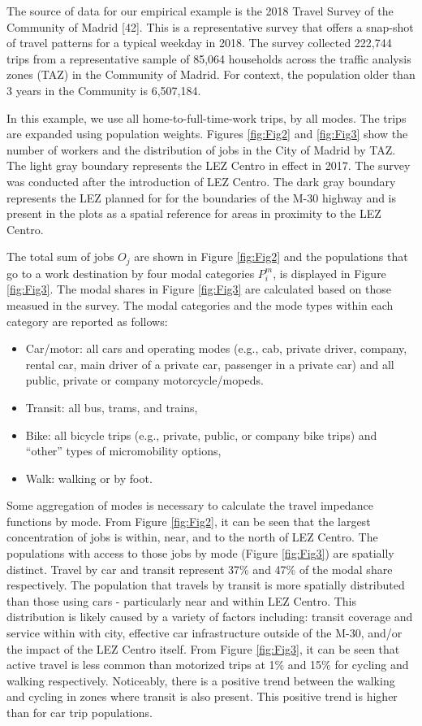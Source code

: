 \documentclass[10pt,letterpaper]{article}
\providecommand{\tightlist}{%
  \setlength{\itemsep}{0pt}\setlength{\parskip}{0pt}}
\begin{document}
The source of data for our empirical example is the 2018 Travel Survey
of the Community of Madrid {[}42{]}. This is a representative survey
that offers a snap-shot of travel patterns for a typical weekday in
2018. The survey collected 222,744 trips from a representative sample of
85,064 households across the traffic analysis zones (TAZ) in the
Community of Madrid. For context, the population older than 3 years in
the Community is 6,507,184.

In this example, we use all home-to-full-time-work trips, by all modes.
The trips are expanded using population weights. Figures \ref{fig:Fig2}
and \ref{fig:Fig3} show the number of workers and the distribution of
jobs in the City of Madrid by TAZ. The light gray boundary represents
the LEZ Centro in effect in 2017. The survey was conducted after the
introduction of LEZ Centro. The dark gray boundary represents the LEZ
planned for for the boundaries of the M-30 highway and is present in the
plots as a spatial reference for areas in proximity to the LEZ Centro.

The total sum of jobs \(O_j\) are shown in Figure \ref{fig:Fig2} and the
populations that go to a work destination by four modal categories
\(P^m_i\), is displayed in Figure \ref{fig:Fig3}. The modal shares in
Figure \ref{fig:Fig3} are calculated based on those measued in the
survey. The modal categories and the mode types within each category are
reported as follows:

\begin{itemize}
\tightlist
\item
  Car/motor: all cars and operating modes (e.g., cab, private driver,
  company, rental car, main driver of a private car, passenger in a
  private car) and all public, private or company motorcycle/mopeds.
\item
  Transit: all bus, trams, and trains,
\item
  Bike: all bicycle trips (e.g., private, public, or company bike trips)
  and ``other'' types of micromobility options,
\item
  Walk: walking or by foot.
\end{itemize}

Some aggregation of modes is necessary to calculate the travel impedance
functions by mode. From Figure \ref{fig:Fig2}, it can be seen that the
largest concentration of jobs is within, near, and to the north of LEZ
Centro. The populations with access to those jobs by mode (Figure
\ref{fig:Fig3}) are spatially distinct. Travel by car and transit
represent 37\% and 47\% of the modal share respectively. The population
that travels by transit is more spatially distributed than those using
cars - particularly near and within LEZ Centro. This distribution is
likely caused by a variety of factors including: transit coverage and
service within with city, effective car infrastructure outside of the
M-30, and/or the impact of the LEZ Centro itself. From Figure
\ref{fig:Fig3}, it can be seen that active travel is less common than
motorized trips at 1\% and 15\% for cycling and walking respectively.
Noticeably, there is a positive trend between the walking and cycling in
zones where transit is also present. This positive trend is higher than
for car trip populations.
\end{document}
